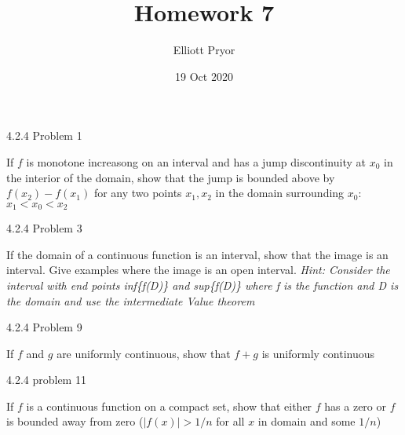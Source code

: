 \documentclass[11pt]{article}
\title{Homework 7}
\author{Elliott Pryor}
\date{19 Oct 2020}
\begin{document}
\maketitle

 4.2.4 Problem 1

If $f$ is monotone increasong on an interval and has a jump discontinuity at $x_0$ in the interior of the domain, show that the jump is bounded above by $f(x_2) - f(x_1)$ for any two points $x_1, x_2$ in the domain surrounding $x_0$: $x_1 < x_0 < x_2$

\hline






 4.2.4 Problem 3

If the domain of a continuous function is an interval, show that the image is an interval. Give examples where the image is an open interval.
\textit{Hint: Consider the interval with end points inf\{f(D)\} and sup\{f(D)\} where f is the function and D is the domain and use the intermediate Value theorem}

\hline






 4.2.4 Problem 9

If $f$ and $g$ are uniformly continuous, show that $f+g$ is uniformly continuous

\hline







 4.2.4 problem 11

If $f$ is a continuous function on a compact set, show that either $f$ has a zero or $f$ is bounded away from zero ($|f(x)| > 1/n$ for all $x$ in domain and some $1/n$)

\hline
\end{document}
